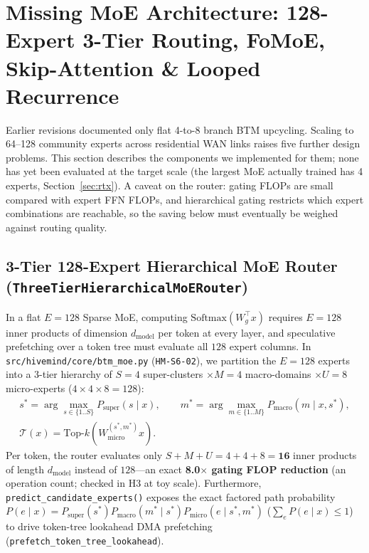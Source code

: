 \documentclass[11pt,a4paper]{article}
\begin{document}
\section{Missing MoE Architecture: 128-Expert 3-Tier Routing, FoMoE, Skip-Attention \& Looped Recurrence}
\label{sec:missing_moe}

Earlier revisions documented only flat 4-to-8 branch BTM upcycling. Scaling to 64--128 community experts across residential WAN links raises five further design problems. This section describes the components we implemented for them; none has yet been evaluated at the target scale (the largest MoE actually trained has 4 experts, Section~\ref{sec:rtx}). A caveat on the router: gating FLOPs are small compared with expert FFN FLOPs, and hierarchical gating restricts which expert combinations are reachable, so the saving below must eventually be weighed against routing quality.

\subsection{3-Tier 128-Expert Hierarchical MoE Router (\texttt{ThreeTierHierarchicalMoERouter})}

In a flat $E=128$ Sparse MoE, computing $\text{Softmax}(W_g^\top x)$ requires $E = 128$ inner products of dimension $d_{\text{model}}$ per token at every layer, and speculative prefetching over a token tree must evaluate all $128$ expert columns. In \texttt{src/hivemind/core/btm\_moe.py} (\texttt{HM-S6-02}), we partition the $E = 128$ experts into a 3-tier hierarchy of $S = 4$ super-clusters $\times M = 4$ macro-domains $\times U = 8$ micro-experts ($4 \times 4 \times 8 = 128$):
\begin{gather}
    s^* = \arg\max_{s \in \{1..S\}} P_{\text{super}}(s \mid x), \qquad m^* = \arg\max_{m \in \{1..M\}} P_{\text{macro}}(m \mid x, s^*), \nonumber\\
    \mathcal{T}(x) = \text{Top-}k\!\left(W_{\text{micro}}^{(s^*, m^*)} x\right).
\end{gather}
Per token, the router evaluates only $S + M + U = 4 + 4 + 8 = \mathbf{16}$ inner products of length $d_{\text{model}}$ instead of $128$---an exact \textbf{8.0$\times$ gating FLOP reduction} (an operation count; checked in H3 at toy scale). Furthermore, \texttt{predict\_candidate\_experts()} exposes the exact factored path probability $P(e \mid x) = P_{\text{super}}(s^*) P_{\text{macro}}(m^* \mid s^*) P_{\text{micro}}(e \mid s^*, m^*)$ ($\sum_e P(e \mid x) \le 1$) to drive token-tree lookahead DMA prefetching (\texttt{prefetch\_token\_tree\_lookahead}).
\end{document}

